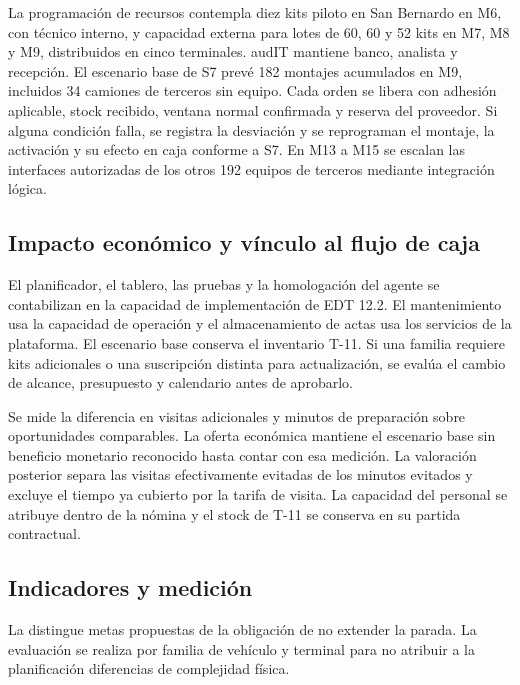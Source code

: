 La programación de recursos contempla diez kits piloto en San Bernardo en M6, con técnico interno, y capacidad externa para lotes de 60, 60 y 52 kits en M7, M8 y M9, distribuidos en cinco terminales. audIT mantiene banco, analista y recepción. El escenario base de S7 prevé 182 montajes acumulados en M9, incluidos 34 camiones de terceros sin equipo. Cada orden se libera con adhesión aplicable, stock recibido, ventana normal confirmada y reserva del proveedor. Si alguna condición falla, se registra la desviación y se reprograman el montaje, la activación y su efecto en caja conforme a S7. En M13 a M15 se escalan las interfaces autorizadas de los otros 192 equipos de terceros mediante integración lógica.

\subsection{Impacto económico y vínculo al flujo de caja}\label{sec:13-proceso-impacto-economico-y-vinculo-al-flujo-de-caja}

El planificador, el tablero, las pruebas y la homologación del agente se contabilizan en la capacidad de implementación de EDT 12.2. El mantenimiento usa la capacidad de operación y el almacenamiento de actas usa los servicios de la plataforma. El escenario base conserva el inventario T-11. Si una familia requiere kits adicionales o una suscripción distinta para actualización, se evalúa el cambio de alcance, presupuesto y calendario antes de aprobarlo.

Se mide la diferencia en visitas adicionales y minutos de preparación sobre oportunidades comparables. La oferta económica mantiene el escenario base sin beneficio monetario reconocido hasta contar con esa medición. La valoración posterior separa las visitas efectivamente evitadas de los minutos evitados y excluye el tiempo ya cubierto por la tarifa de visita. La capacidad del personal se atribuye dentro de la nómina y el stock de T-11 se conserva en su partida contractual.

\subsection{Indicadores y medición}\label{sec:13-proceso-indicadores-y-medicion}

La  distingue metas propuestas de la obligación de no extender la parada. La evaluación se realiza por familia de vehículo y terminal para no atribuir a la planificación diferencias de complejidad física.

